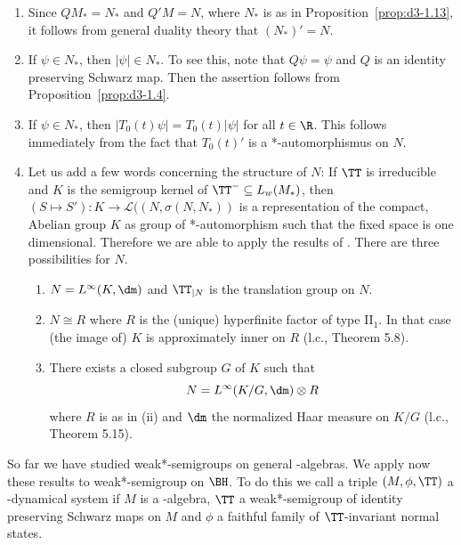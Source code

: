 \begin{remarks}\label{rem:d4-3.6}
\begin{enumerate}[\upshape (i), wide, labelindent=.25em]
\item
Since $QM_{*} = N_{*}$ and $Q'M = N$, where $N_{*}$ is as in Proposition~\ref{prop:d3-1.13}, it follows from general duality theory that $(N_{*})' = N$.

\item
If\/ $\psi \in N_{*}$, then $|\psi| \in N_{*}$.
To see this, note that $Q\psi = \psi$ and $Q$ is an identity preserving Schwarz map.
Then the assertion follows from Proposition~\ref{prop:d3-1.4}.

\item
If\/ $\psi \in N_{*}$, then $|T_{0}(t)\psi| = T_{0}(t)|\psi|$ for all $t \in \R$.
This follows immediately from the fact that $T_{0}(t)'$ is a *-automorphismus on $N$.

\item
Let us add a few words concerning the structure of\/ $N$: If\/ $\TT$ is irreducible and $K$ is the semigroup kernel of\/ $\TT^{-} \subseteq L_{w}(M_{*})$, then 
$(S \mapsto S'): K \to \mathcal{L}( (N,\sigma(N,N_{*}) )$ is a representation of the compact, Abelian group $K$ as group of *-automorphism such that the fixed space is one dimensional.
Therefore we are able to apply the results of \textcite{olesen:1980}.
There are three possibilities for $N$.
\begin{enumerate}[\upshape(i), wide, labelindent=.25em]
\item
$N = L^{\infty}(K,\dm)$ and $\TT_{\vert N}$ is the translation group on $N$.

\item
$N \cong R$ where $R$ is the (unique) hyperfinite factor of type II$_{1}$.
In that case (the image of) $K$ is approximately inner on $R$ (l.c., Theorem 5.8).

\item
There exists a closed subgroup $ G $  of\/ $ K $  such that
\[
N = L^{\infty}(K/G, \dm) \otimes R
\]
where $ R $  is as in (ii) and $ \dm $  the normalized Haar measure on $ K/G $  (l.c., Theorem 5.15).
\end{enumerate}
\end{enumerate}
\end{remarks}
So far we have studied weak*-semigroups on general \WA-algebras.
We apply now these results to weak*-semigroup on $ \BH $.
To do this we call a triple $ (M,\phi,\TT) $  a \WA-dynamical system if\/ $ M $  is a \WA-algebra, $ \TT$ a weak*-semigroup of identity preserving Schwarz maps on $ M $  and $ \phi $  a faithful family of\/ $ \TT $-invariant normal states.
